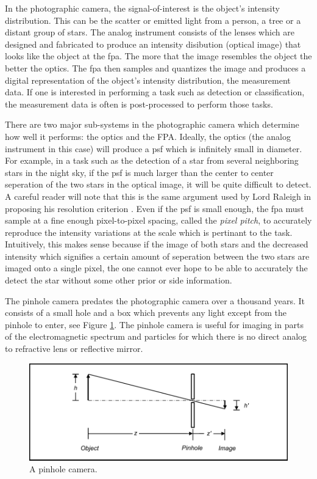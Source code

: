 In the photographic camera, the signal-of-interest is the object's intensity distribution. This can be the scatter or emitted light from a person, a tree or a distant group of stars. The analog instrument consists of the lenses which are designed and fabricated to produce an intensity disibution (optical image) that looks like the object at the \gls{fpa}. The more that the image resembles the object the better the optics. The \gls{fpa} then samples and quantizes the image and produces a digital representation of the object's intensity distribution, the measurement data. If one is interested in performing a task such as detection or classification, the measurement data is often is post-processed to perform those tasks. 


There are two major sub-systems in the photographic camera which determine how well it performs: the optics and the FPA. Ideally, the optics (the analog instrument in this case) will produce a \gls{psf} which is infinitely small in diameter. For example, in a task such as the detection of a star from several neighboring stars in the night sky, if the \gls{psf} is much larger than the center to center seperation of the two stars in the optical image, it will be quite difficult to detect. A careful reader will note that this is the same argument used by Lord Raleigh in proposing his resolution criterion \cite{rayleigh1879investigations}. Even if the \gls{psf} is small enough, the \gls{fpa} must sample at a fine enough pixel-to-pixel spacing, called the \emph{pixel pitch}, to accurately reproduce the intensity variations at the scale which is pertinant to the task. Intuitively, this makes sense because if the image of both stars and the decreased intensity which signifies a certain amount of seperation between the two stars are imaged onto a single pixel, the one cannot ever hope to be able to accurately the detect the star without some other prior or side information. 

The pinhole camera predates the photographic camera over a thousand years. It consists of a small hole and a box which prevents any light except from the pinhole to enter, see Figure \ref{fig:pinholecamera}. The pinhole camera is useful for imaging in parts of the electromagnetic spectrum and particles for which there is no direct analog to refractive lens or reflective mirror. 

\begin{figure}
    \centering
    \includegraphics[scale=1]{pinholecamera}
    \caption{A pinhole camera.}
    \label{fig:pinholecamera}
\end{figure}

